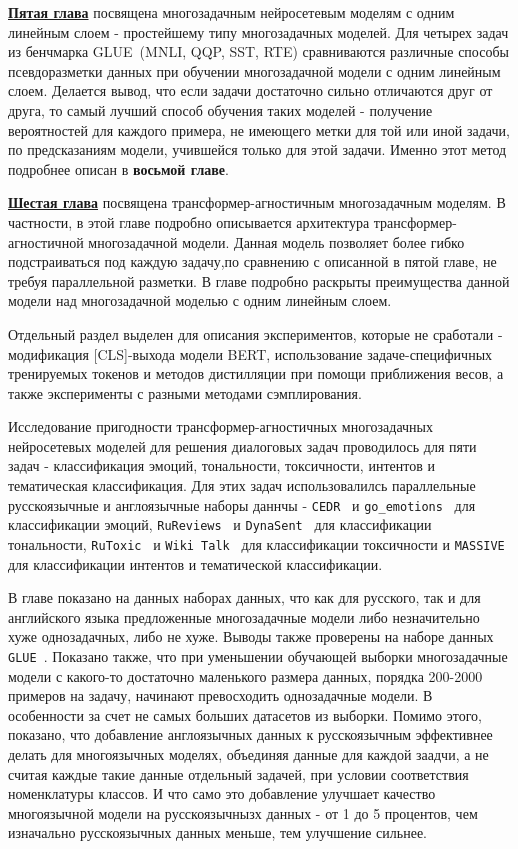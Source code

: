 \underline{\textbf{Пятая глава}} посвящена многозадачным нейросетевым моделям с одним линейным слоем - простейшему типу многозадачных моделей. Для четырех задач из бенчмарка GLUE~\cite{wang_2018}(MNLI, QQP, SST, RTE) сравниваются различные способы псевдоразметки данных при обучении многозадачной модели с одним линейным слоем. Делается вывод, что если задачи достаточно сильно отличаются друг от друга, то самый лучший способ обучения таких моделей - получение вероятностей для каждого примера, не имеющего метки для той или иной задачи, по предсказаниям модели, учившейся только для этой задачи. Именно этот метод подробнее описан в \textbf{восьмой главе}.

\underline{\textbf{Шестая глава}} посвящена трансформер-агностичным многозадачным моделям. В частности, в этой главе подробно описывается архитектура трансформер-агностичной многозадачной модели. Данная модель позволяет более гибко подстраиваться под каждую задачу,по сравнению с описанной в пятой главе, не требуя параллельной разметки. В главе подробно раскрыты преимущества данной модели над многозадачной моделью с одним линейным слоем.

Отдельный раздел выделен для описания экспериментов, которые не сработали - модификация [CLS]-выхода модели BERT, использование задаче-специфичных тренируемых токенов и методов дистилляции при помощи приближения весов, а также эксперименты с разными методами сэмплирования. 

Исследование пригодности трансформер-агностичных многозадачных нейросетевых моделей для решения диалоговых задач проводилось для пяти задач - классификация эмоций, тональности, токсичности, интентов и тематическая классификация. Для этих задач использовалилсь параллельные русскоязычные и англоязычные наборы даннчы - \texttt{CEDR}~\cite{cedr} и \texttt{go_emotions}~\cite{go_emotions} для классификации эмоций, \texttt{RuReviews}~\cite{rureviews} и \texttt{DynaSent}~\cite{dynasent} для классификации тональности, \texttt{RuToxic}~\cite{rutoxic} и \texttt{Wiki Talk}~\cite{wikitalk} для классификации токсичности и \texttt{MASSIVE}~\cite{massive} для классификации интентов и тематической классификации.

В главе показано на данных наборах данных, что как для русского, так и для английского языка предложенные многозадачные модели либо незначительно хуже однозадачных, либо не хуже. Выводы также проверены на наборе данных \texttt{GLUE}~\cite{glue}. Показано также, что при уменьшении обучающей выборки многозадачные модели с какого-то достаточно маленького размера данных, порядка 200-2000 примеров на задачу, начинают превосходить однозадачные модели. В особенности за счет не самых больших датасетов из выборки. Помимо этого, показано, что добавление англоязычных данных к русскоязычным эффективнее делать для многоязычных моделях, объединяя данные для каждой заадчи, а не считая каждые такие данные отдельный задачей, при условии соответствия номенклатуры классов. И что само это добавление улучшает качество многоязычной модели на русскоязычнызх данных - от 1 до 5 процентов, чем изначально русскоязычных данных меньше, тем улучшение сильнее.


